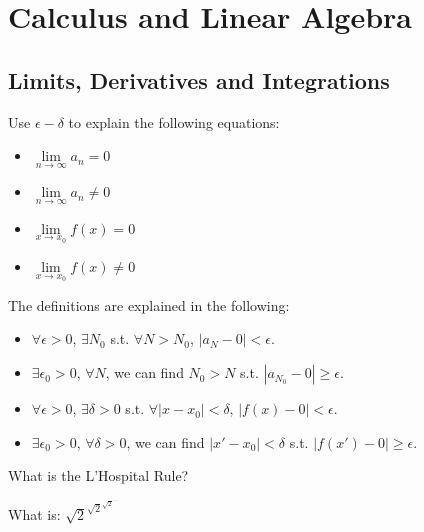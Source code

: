 \chapter{Calculus and Linear Algebra}

\section{Limits, Derivatives and Integrations}
\begin{exe}[Limit]
Use $\epsilon-\delta$ to explain the following equations:
\begin{itemize}
    \item $\lim\limits_{n \rightarrow \infty}a_n=0$
    \item $\lim\limits_{n \rightarrow \infty}a_n \neq 0$
    \item $\lim\limits_{x \rightarrow x_0} f(x) = 0$
    \item $\lim\limits_{x \rightarrow x_0} f(x) \neq 0$
\end{itemize}
\end{exe}
\begin{teacher}
\begin{sol}
The definitions are explained in the following:
\begin{itemize}
    \item $\forall \epsilon >0$, $\exists N_0$ s.t. $\forall N>N_0$, $|a_N-0|<\epsilon$.
    \item $\exists \epsilon_0 >0$, $\forall N$, we can find $N_0>N$ s.t. $|a_{N_0} - 0| \geq \epsilon$.
    \item $\forall \epsilon >0$, $\exists \delta >0$ s.t. $\forall |x-x_0|<\delta$, $|f(x) - 0|<\epsilon$.
    \item $\exists \epsilon_0 >0$, $\forall \delta >0$, we can find $|x'-x_0|<\delta$ s.t. $|f(x') - 0| \geq \epsilon$.
\end{itemize}
\end{sol}
\end{teacher}

\begin{exe}
What is the L'Hospital Rule?
\end{exe}
\begin{teacher}
\begin{sol}
\end{sol}
\end{teacher}

\begin{exe}
What is: $\sqrt{2}^{\sqrt{2}^{\sqrt{2}^{\cdots}}}$
\end{exe}
\begin{teacher}
\begin{sol}
\end{sol}
\end{teacher}

